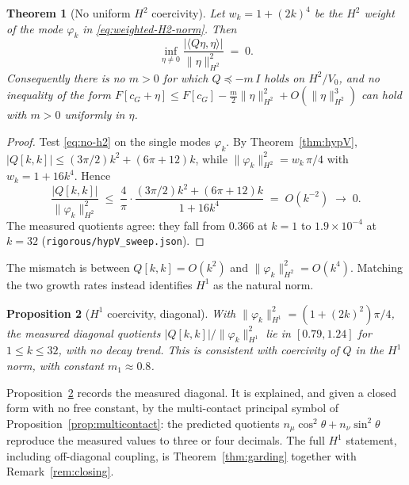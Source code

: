 \documentclass[11pt]{amsart}
\theoremstyle{plain}
\newtheorem{theorem}{Theorem}
\newtheorem{proposition}[theorem]{Proposition}
\theoremstyle{definition}
\newcommand{\cG}{c_{G}}
\begin{document}
\begin{theorem}[No uniform $H^{2}$ coercivity]\label{thm:no-h2}
Let $w_{k} = 1 + (2k)^{4}$ be the $H^{2}$ weight of the mode
$\varphi_{k}$ in \eqref{eq:weighted-H2-norm}.  Then
\begin{equation}\label{eq:no-h2}
  \inf_{\eta \neq 0} \frac{|\langle Q\eta, \eta\rangle|}
                          {\|\eta\|_{H^{2}}^{2}} \;=\; 0 .
\end{equation}
Consequently there is no $m > 0$ for which
$Q \preceq -m\,I$ holds on $H^{2}/V_{0}$, and no inequality of the
form $F[\cG + \eta] \leq F[\cG] - \tfrac{m}{2}\|\eta\|_{H^{2}}^{2} +
O(\|\eta\|_{H^{2}}^{3})$ can hold with $m>0$ uniformly in $\eta$.
\end{theorem}

\begin{proof}
Test \eqref{eq:no-h2} on the single modes $\varphi_{k}$.  By
Theorem~\ref{thm:hypV}, $|Q[k,k]| \leq (3\pi/2)k^{2} + (6\pi+12)k$,
while $\|\varphi_{k}\|_{H^{2}}^{2} = w_{k}\,\pi/4$ with
$w_{k} = 1 + 16k^{4}$.  Hence
\[
  \frac{|Q[k,k]|}{\|\varphi_{k}\|_{H^{2}}^{2}}
   \;\leq\; \frac{4}{\pi}\cdot
            \frac{(3\pi/2)k^{2} + (6\pi+12)k}{1 + 16k^{4}}
   \;=\; O(k^{-2}) \;\longrightarrow\; 0 .
\]
The measured quotients agree: they fall from $0.366$ at $k = 1$ to
$1.9\times 10^{-4}$ at $k = 32$
(\texttt{rigorous/hypV\_sweep.json}).
\end{proof}

The mismatch is between $Q[k,k] = O(k^{2})$ and
$\|\varphi_{k}\|_{H^{2}}^{2} = O(k^{4})$.  Matching the two growth
rates instead identifies $H^{1}$ as the natural norm.

\begin{proposition}[$H^{1}$ coercivity, diagonal]\label{prop:h1}
With $\|\varphi_{k}\|_{H^{1}}^{2} = (1 + (2k)^{2})\pi/4$, the measured
diagonal quotients $|Q[k,k]| / \|\varphi_{k}\|_{H^{1}}^{2}$ lie in
$[0.79, 1.24]$ for $1 \leq k \leq 32$, with no decay trend.  This is
consistent with coercivity of $Q$ in the $H^{1}$ norm, with constant
$m_{1} \approx 0.8$.
\end{proposition}

Proposition~\ref{prop:h1} records the measured diagonal.  It is
explained, and given a closed form with no free constant, by the
multi-contact principal symbol of
Proposition~\ref{prop:multicontact}: the predicted quotients
$n_{\mu}\cos^{2}\theta + n_{\nu}\sin^{2}\theta$ reproduce the measured
values to three or four decimals.  The full $H^{1}$ statement,
including off-diagonal coupling, is
Theorem~\ref{thm:garding} together with Remark~\ref{rem:closing}.
\end{document}
